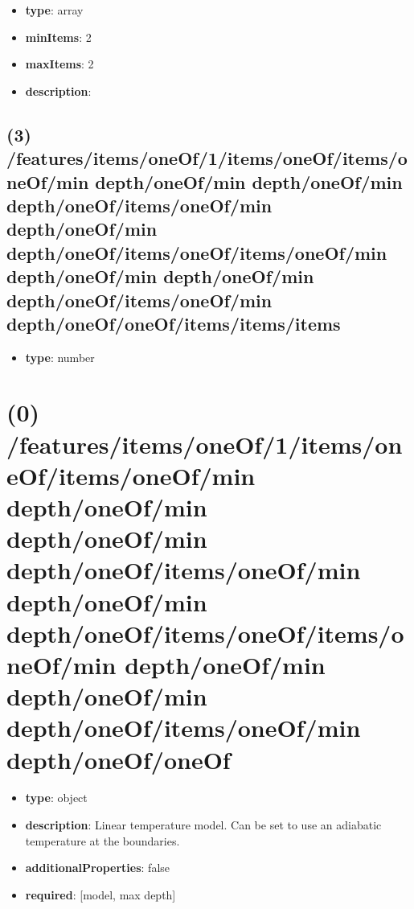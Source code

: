 \begin{itemize}[leftmargin=2em]\item {\bf type}: array
\item {\bf minItems}: 2
\item {\bf maxItems}: 2
\item {\bf description}: 
\end{itemize}\subsection{(3) /features/items/oneOf/1/items/oneOf/items/oneOf/min depth/oneOf/min depth/oneOf/min depth/oneOf/items/oneOf/min depth/oneOf/min depth/oneOf/items/oneOf/items/oneOf/min depth/oneOf/min depth/oneOf/min depth/oneOf/items/oneOf/min depth/oneOf/oneOf/items/items/items}
\begin{itemize}[leftmargin=3em]\item {\bf type}: number
\end{itemize}\section{(0) /features/items/oneOf/1/items/oneOf/items/oneOf/min depth/oneOf/min depth/oneOf/min depth/oneOf/items/oneOf/min depth/oneOf/min depth/oneOf/items/oneOf/items/oneOf/min depth/oneOf/min depth/oneOf/min depth/oneOf/items/oneOf/min depth/oneOf/oneOf}
\begin{itemize}[leftmargin=0em]\item {\bf type}: object
\item {\bf description}: Linear temperature model. Can be set to use an adiabatic temperature at the boundaries.
\item {\bf additionalProperties}: false
\item {\bf required}: [model, max depth]\end{itemize}
